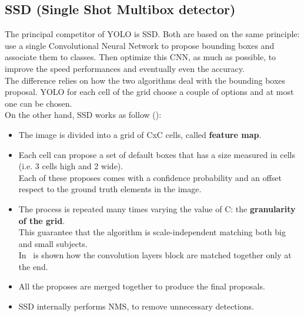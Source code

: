 \subsection{SSD (Single Shot Multibox detector)} \label{sec:ssd}
The principal competitor of YOLO is SSD\cite{ssd}. Both are based on the same principle: use a single Convolutional Neural Network to propose bounding boxes and associate them to classes. Then optimize this CNN, as much as possible, to improve the speed performances and eventually even the accuracy.\\
The difference relies on how the two algorithms deal with the bounding boxes proposal. YOLO for each cell of the grid choose a couple of options and at most one can be chosen.\\
On the other hand, SSD works as follow ():
\begin{itemize}
	\item The image is divided into a grid of CxC cells, called \textbf{feature map}.
	\item Each cell can propose a set of default boxes that has a size measured in cells (i.e. 3 cells high and 2 wide).\\
	Each of these proposes comes with a confidence probability and an offset respect to the ground truth elements in the image.
	\item The process is repeated many times varying the value of C: the \textbf{granularity of the grid}.\\
	This guarantee that the algorithm is scale-independent matching both big and small subjects.\\
	In~ is shown how the convolution layers block are matched together only at the end.
	\item All the proposes are merged together to produce the final proposals.
	\item SSD internally performs NMS, to remove unnecessary detections.
\end{itemize}

